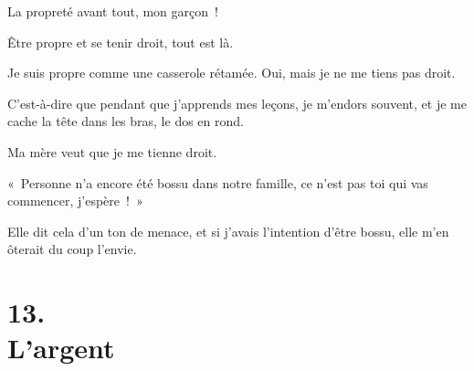 \documentclass[french,twoside]{book} %
\begin{document}
La propreté avant tout, mon garçon !\par
Être propre et se tenir droit, tout est là.\par
\bigbreak
\noindent Je suis propre comme une casserole rétamée. Oui, mais je ne me tiens pas droit.\par
C’est-à-dire que pendant que j’apprends mes leçons, je m’endors souvent, et je me cache la tête dans les bras, le dos en rond.\par
Ma mère veut que je me tienne droit.\par
« Personne n’a encore été bossu dans notre famille, ce n’est pas toi qui vas commencer, j’espère ! »\par
Elle dit cela d’un ton de menace, et si j’avais l’intention d’être bossu, elle m’en ôterait du coup l’envie.
\section[{13. L’argent}]{13. \\
L’argent}\renewcommand{\leftmark}{13. \\
L’argent}
\end{document}
